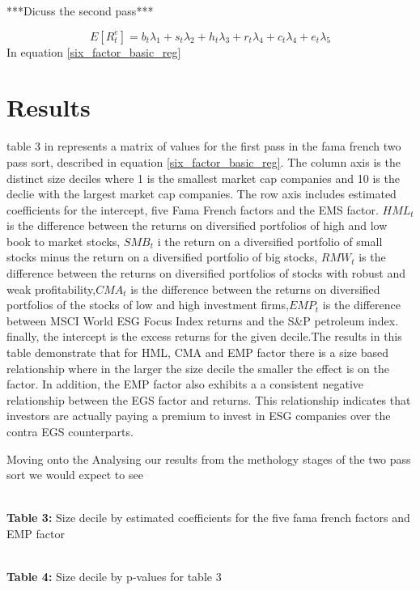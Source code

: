\documentclass[12pt,oneside,reqno]{amsart}
\begin{document}
***Dicuss the second pass***


\begin{equation}
    E[R^e_{t}]= b_t\lambda_1+s_t\lambda_2 +h_t \lambda_3 +r_t\lambda_4 +c_t \lambda_4 + e_t \lambda_5
\end{equation}
In equation \eqref{six_factor_basic_reg} 


\section{Results}
\label{Results}
table 3 in represents a matrix of values for the first pass in the fama french two pass sort, described in equation \eqref{six_factor_basic_reg}. The column axis is the distinct size deciles where 1 is the smallest market cap companies and 10 is the declie with the largest market cap companies. The row axis includes estimated coefficients for the intercept, five Fama French factors and the EMS factor. $HML_{t}$ is the difference between the returns on diversified portfolios of high and low book to market stocks, $SMB_{t}$ i the return on a diversified portfolio of small stocks minus the return on a diversified portfolio of big stocks, $RMW_t$ is the difference between the returns on diversified portfolios of stocks with robust and weak profitability,$CMA_{t}$ is the difference between the returns on diversified portfolios of the stocks of low and high investment firms,$EMP_t$ is the difference between MSCI World ESG Focus Index returns and the S\&P petroleum index. finally, the intercept is the excess returns for the given decile.The results in this table demonstrate that for HML, CMA and EMP factor there is a size based relationship where in the larger the size decile the smaller the effect is on the factor. In addition, the EMP factor also exhibits a  a consistent negative relationship between the EGS factor and returns. This relationship indicates that investors are actually paying a premium to invest in ESG companies over the contra EGS counterparts.

Moving onto the 
Analysing our results from the methology  stages of the two pass sort we would expect to see  

\begin{center}
\\
\textbf{Table 3:} Size decile by estimated coefficients for the  five fama french factors and EMP factor
\end{center}
\begin{center}
\\
\textbf{Table 4:} Size decile by p-values for table 3
    
\end{center}
\end{document}
